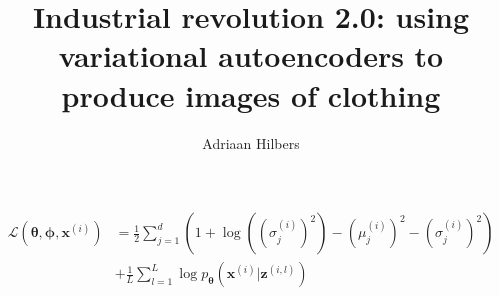 \message{ !name(Report.tex)}\documentclass[]{article}
\title{Industrial revolution 2.0: using variational autoencoders to produce images of clothing}
\author{Adriaan Hilbers}
\begin{document}
\begin{align}
  \label{eq:loss}
  \mathcal{L}(\bm{\theta}, \bm{\phi}, \bm{x}^{(i)}) &= \frac{1}{2} \sum_{j=1}^d \left( 1 + \log{((\sigma_j^{(i)})^2)} - (\mu_j^{(i)})^2 - (\sigma_j^{(i)})^2 \right) \\
  &+ \frac{1}{L} \sum_{l=1}^L \log{p_{\bm{\theta}}(\bm{x}^{(i)}|\bm{z}^{(i, l)})}
\end{align}
\end{document}
